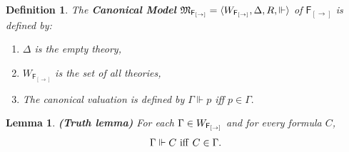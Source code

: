 \documentclass[12pt]{article}
\newtheorem{lem}[thm]{Lemma}
\newtheorem{dfn}[thm]{Definition}
\begin{document}
\begin{dfn}
The \textbf{Canonical Model} $ \mathfrak{M}_{{\sf F_{[\rightarrow]}}}=\langle W_{{\sf F_{[\rightarrow]}}}, \Delta, R, \Vdash\rangle $ of $\mathsf{F_{[\rightarrow ]}}$ is defined by:
\begin{enumerate}
\item  $ \Delta $ is the empty theory,

\item  $ W_{{\mathsf F_{[\rightarrow]}}} $ is the set of all theories,

\item The canonical valuation is defined by
$ \Gamma\Vdash p$ iff $p \in \Gamma .$
\end{enumerate}
\end{dfn}

\begin{lem}\label{D1}
\em\textbf{(Truth lemma)} For each $ \Gamma \in  W_{{\sf F_{[\rightarrow]}}}$ and for every formula $  C $, $$ \Gamma\Vdash   C~{\rm iff}~ C \in \Gamma .$$
\end{lem}
\end{document}
